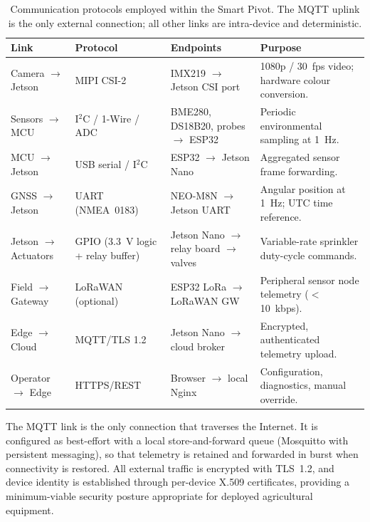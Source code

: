 \documentclass[12pt,a4paper]{report}
\renewcommand{\arraystretch}{1.3}
\begin{document}
\begin{table}[H]
\centering
\small
\caption{Communication protocols employed within the Smart Pivot. The MQTT uplink is the only external connection; all other links are intra-device and deterministic.}
\label{tab:protocols}
\setlength{\tabcolsep}{4pt}
\renewcommand{\arraystretch}{1.3}
\begin{tabular}{|P{0.18\textwidth}|P{0.15\textwidth}|P{0.27\textwidth}|P{0.30\textwidth}|}
\hline
{}
\textbf{Link} & \textbf{Protocol} & \textbf{Endpoints} & \textbf{Purpose} \\
\hline
Camera $\to$ Jetson & MIPI CSI-2 & IMX219 $\to$ Jetson CSI port & 1080p / 30~fps video; hardware colour conversion. \\
\hline
{}
Sensors $\to$ MCU & I$^2$C / 1-Wire / ADC & BME280, DS18B20, probes $\to$ ESP32 & Periodic environmental sampling at 1~Hz. \\
\hline
MCU $\to$ Jetson & USB serial / I$^2$C & ESP32 $\to$ Jetson Nano & Aggregated sensor frame forwarding. \\
\hline
{}
GNSS $\to$ Jetson & UART (NMEA~0183) & NEO-M8N $\to$ Jetson UART & Angular position at 1~Hz; UTC time reference. \\
\hline
Jetson $\to$ Actuators & GPIO (3.3~V logic + relay buffer) & Jetson Nano $\to$ relay board $\to$ valves & Variable-rate sprinkler duty-cycle commands. \\
\hline
{}
Field $\to$ Gateway & LoRaWAN (optional) & ESP32 LoRa $\to$ LoRaWAN GW & Peripheral sensor node telemetry ($<$10~kbps). \\
\hline
Edge $\to$ Cloud & MQTT/TLS 1.2 & Jetson Nano $\to$ cloud broker & Encrypted, authenticated telemetry upload. \\
\hline
{}
Operator $\to$ Edge & HTTPS/REST & Browser $\to$ local Nginx & Configuration, diagnostics, manual override. \\
\hline
\end{tabular}
\end{table}

The MQTT link is the only connection that traverses the Internet. It is configured as best-effort with a local store-and-forward queue (Mosquitto with persistent messaging), so that telemetry is retained and forwarded in burst when connectivity is restored. All external traffic is encrypted with TLS~1.2, and device identity is established through per-device X.509 certificates, providing a minimum-viable security posture appropriate for deployed agricultural equipment.
\end{document}
